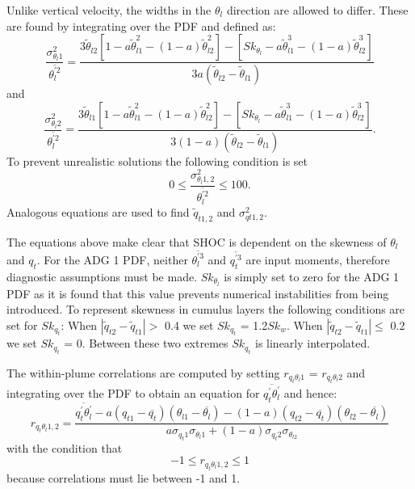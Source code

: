 Unlike vertical velocity, the widths in the $\theta_{l}$ direction are allowed to differ.  These are found by integrating over the PDF and defined as:
%
\begin{equation}
  \frac{\sigma_{\theta_{l}1}^{2}}{\overline{\theta_{l}^{'2}}}=\frac{3\tilde{\theta}_{l2}[1-a\tilde{\theta}_{l1}^{2}-(1-a)\tilde{\theta}_{l2}^{2}]-[Sk_{\theta_{l}}-a\tilde{\theta}_{l1}^{3}-(1-a)\tilde{\theta}_{l2}^{3}]}{3a(\tilde{\theta}_{l2}-\tilde{\theta}_{l1})}
  \label{sig_thl1}
\end{equation}
%
and
%
\begin{equation}
    \frac{\sigma_{\theta_{l}2}^{2}}{\overline{\theta_{l}^{'2}}}=\frac{3\tilde{\theta}_{l1}[1-a\tilde{\theta}_{l1}^{2}-(1-a)\tilde{\theta}_{l2}^{2}]-[Sk_{\theta_{l}}-a\tilde{\theta}_{l1}^{3}-(1-a)\tilde{\theta}_{l2}^{3}]}{3(1-a)(\tilde{\theta}_{l2}-\tilde{\theta}_{l1})}.
  \label{sig_thl2}
\end{equation}
%
To prevent unrealistic solutions the following condition is set
%
\begin{equation}
  0 \le \frac{\sigma_{\theta_{l}1,2}^{2}}{\overline{\theta_{l}^{'2}}} \le 100.
  \label{cond}
\end{equation}
%  
Analogous equations are used to find $\tilde{q}_{t1,2}$ and $\sigma_{qt1,2}^{2}$.  

The equations above make clear that SHOC is dependent on the skewness of $\theta_{l}$ and $q_{t}$.  For the ADG 1 PDF, neither $\overline{\theta_{l}^{'3}}$ and $\overline{q_{t}^{'3}}$ are input moments, therefore diagnostic assumptions must be made.  $Sk_{\theta_{l}}$ is simply set to zero for the ADG 1 PDF as it is found that this value prevents numerical instabilities from being introduced.  To represent skewness in cumulus layers the following conditions are set for $Sk_{q_{t}}$:  When $|\tilde{q}_{t2}-\tilde{q}_{t1}| >$ 0.4 we set $Sk_{q_{t}}$ = 1.2$Sk_{w}$.  When $|\tilde{q}_{t2}-\tilde{q}_{t1}| \le$ 0.2 we set $Sk_{q_{t}}$ = 0.  Between these two extremes $Sk_{q_{t}}$ is linearly interpolated.    

The within-plume correlations are computed by setting $r_{q_{t}\theta_{l}1}$ = $r_{q_{t}\theta_{l}2}$ and integrating over the PDF to obtain an equation for $\overline{q_{t}^{'}\theta_{l}^{'}}$ and hence: 
%
\begin{equation}
  r_{q_{t}\theta_{l}1,2}=\frac{\overline{q_{t}^{'}\theta_{l}^{'}}-a(q_{t1}-\overline{q_{t}})(\theta_{l1}-\overline{\theta_{l}})-(1-a)(q_{t2}-\overline{q_{t}})(\theta_{l2}-\overline{\theta_{l}})}{a\sigma_{q_{t}1}\sigma_{\theta_{l}1}+(1-a)\sigma_{q_{t}2}\sigma_{\theta_{l2}}}
 \label{corr_eq}
\end{equation}
% 
with the condition that
%
\begin{equation}
-1 \le  r_{q_{t}\theta_{l}1,2} \le 1
\end{equation}
%
because correlations must lie between -1 and 1.  

